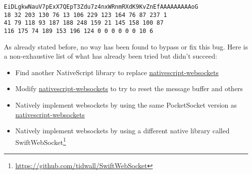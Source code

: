 \begin{description}[style=nextline]
\begin{description}[style=nextline]
\item[Received]
\begin{lstlisting}
EiDLgkwNauV7pExX7QEpT3Zdu7z4nxWRnmRXdK9KvZnEfAAAAAAAAAoG
18 32 203 130 76 13 106 229 123 164 76 87 237 1
41 79 118 93 187 188 248 159 21 145 158 100 87
116 175 74 189 153 196 124 0 0 0 0 0 0 10 6
\end{lstlisting}
\end{description}
As already stated before, no way has been found to bypass or fix this bug. Here is a non-exhaustive list of what has already been tried but didn't succeed:
\begin{itemize}
\item Find another NativeScript library to replace \url{nativescript-websockets}
\item Modify \url{nativescript-websockets} to try to reset the message buffer and others
\item Natively implement websockets by using the same PocketSocket version as \url{nativescript-websockets}
\item Natively implement websockets by using a different native library called SwiftWebSocket\footnote{\url{https://github.com/tidwall/SwiftWebSocket}}
\end{itemize}
\end{description}
